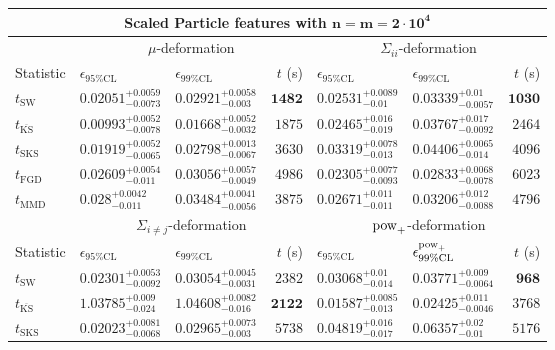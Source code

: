 \begin{tabular}{l|llr|llr}
	\toprule
	\multicolumn{7}{c}{{\bf Scaled Particle features with $\mathbf{n=m=2\cdot 10^{4}}$}} \\
	\toprule
	\multicolumn{1}{c}{} & \multicolumn{3}{c}{$\mu$-deformation} & \multicolumn{3}{c}{$\Sigma_{ii}$-deformation} \\
	Statistic & $\epsilon_{95\%\mathrm{CL}}$ & $\epsilon_{99\%\mathrm    {CL}}$ & $t$ (s) & $\epsilon_{95\%\mathrm{CL}}$ & $\epsilon_{99\%\mathrm{CL}}$ & $t$ (s) \\
	\midrule
	$t_{\mathrm{SW}}$ & $0.02051_{-0.0073}^{+0.0059}$ & $0.02921_{-0.003}^{+0.0058}$ & ${\mathbf{1482}}$ & $0.02531_{-0.01}^{+0.0089}$ & $0.03339_{-0.0057}^{+0.01}$ & ${\mathbf{1030}}$ \\
	$t_{\overline{\mathrm{KS}}}$ & ${\mathbf{0.00993_{-0.0078}^{+0.0052}}}$ & ${\mathbf{0.01668_{-0.0032}^{+0.0052}}}$ & $1875$ & $0.02465_{-0.019}^{+0.016}$ & $0.03767_{-0.0092}^{+0.017}$ & $2464$ \\
	$t_{\mathrm{SKS}}$ & $0.01919_{-0.0065}^{+0.0052}$ & $0.02798_{-0.0067}^{+0.0013}$ & $3630$ & $0.03319_{-0.013}^{+0.0078}$ & $0.04406_{-0.014}^{+0.0065}$ & $4096$ \\
	$t_{\mathrm{FGD}}$ & $0.02609_{-0.011}^{+0.0054}$ & $0.03056_{-0.0049}^{+0.0057}$ & $4986$ & ${\mathbf{0.02305_{-0.0093}^{+0.0077}}}$ & ${\mathbf{0.02833_{-0.0078}^{+0.0068}}}$ & $6023$ \\
	$t_{\mathrm{MMD}}$ & $0.028_{-0.011}^{+0.0042}$ & $0.03484_{-0.0056}^{+0.0041}$ & $3875$ & $0.02671_{-0.011}^{+0.011}$ & $0.03206_{-0.0088}^{+0.012}$ & $4796$ \\
	\toprule
	\multicolumn{1}{c}{} & \multicolumn{3}{c}{$\Sigma_{i\neq j}$-deformation} & \multicolumn{3}{c}{$\rm{pow}_{+}$-deformation} \\
	Statistic & $\epsilon_{95\%\mathrm{CL}}$ & $\epsilon_{99\%\mathrm{CL}}$ & $t$ (s) & $\epsilon_{95\%\mathrm{CL}}$ & $\epsilon^{\rm   {pow}_{+}}_{99\%\mathrm{CL}}$ & $t$ (s) \\
	\midrule
	$t_{\mathrm{SW}}$ & $0.02301_{-0.0092}^{+0.0053}$ & $0.03054_{-0.0031}^{+0.0045}$ & $2382$ & $0.03068_{-0.014}^{+0.01}$ & $0.03771_{-0.0064}^{+0.009}$ & ${\mathbf{968}}$ \\
	$t_{\overline{\mathrm{KS}}}$ & $1.03785_{-0.024}^{+0.009}$ & $1.04608_{-0.016}^{+0.0082}$ & ${\mathbf{2122}}$ & ${\mathbf{0.01587_{-0.013}^{+0.0085}}}$ & ${\mathbf{0.02425_{-0.0046}^{+0.011}}}$ & $3768$ \\
	$t_{\mathrm{SKS}}$ & $0.02023_{-0.0068}^{+0.0081}$ & $0.02965_{-0.003}^{+0.0073}$ & $5738$ & $0.04819_{-0.017}^{+0.016}$ & $0.06357_{-0.01}^{+0.02}$ & $5176$ \\

\end{tabular}
